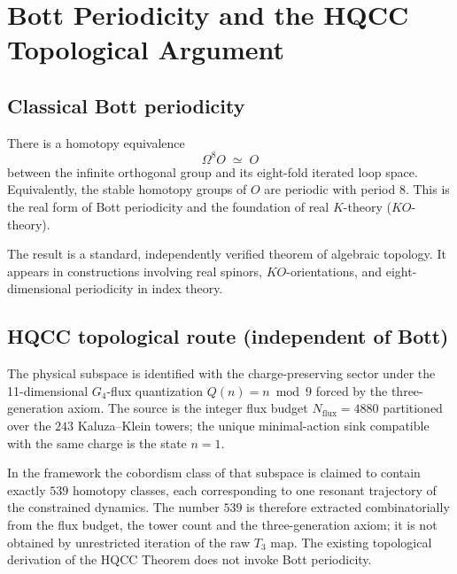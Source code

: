 
\chapter{Bott Periodicity and the HQCC Topological Argument}
\label{ch:bott-hqcc}

\section{Classical Bott periodicity}

\begin{theorem}
\label{thm:bott}
There is a homotopy equivalence
\begin{equation}
\Omega^8 O \;\simeq\; O
\end{equation}
between the infinite orthogonal group and its eight-fold iterated loop space.
Equivalently, the stable homotopy groups of \(O\) are periodic with period 8.
This is the real form of Bott periodicity and the foundation of real
\(K\)-theory (\(KO\)-theory).
\end{theorem}

The result is a standard, independently verified theorem of algebraic topology.
It appears in constructions involving real spinors, \(KO\)-orientations, and
eight-dimensional periodicity in index theory.

\section{HQCC topological route (independent of Bott)}

\begin{definition}
The physical subspace is identified with the charge-preserving sector under
the 11-dimensional \(G_4\)-flux quantization \(Q(n)=n\bmod 9\) forced by the
three-generation axiom. The source is the integer flux budget
\(N_{\mathrm{flux}}=4880\) partitioned over the \(243\) Kaluza--Klein towers;
the unique minimal-action sink compatible with the same charge is the state
\(n=1\).
\end{definition}

\begin{remark}[Extraction of 539]
In the framework the cobordism class of that subspace is claimed to contain
exactly \(539\) homotopy classes, each corresponding to one resonant trajectory
of the constrained dynamics. The number \(539\) is therefore extracted
combinatorially from the flux budget, the tower count and the three-generation
axiom; it is not obtained by unrestricted iteration of the raw \(T_3\) map.
The existing topological derivation of the HQCC Theorem does not invoke Bott
periodicity.
\end{remark}

